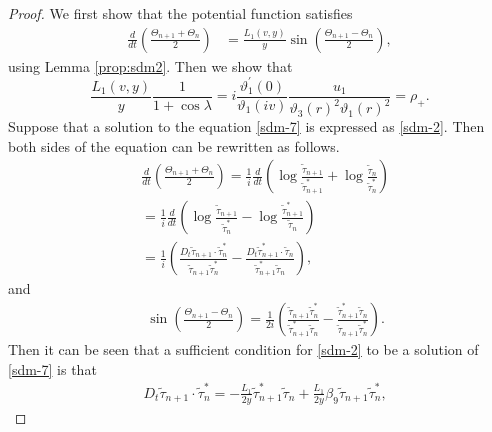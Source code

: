 \documentclass[10pt,leqno]{amsart}
\numberwithin{equation}{section}
\begin{document}
\begin{proof}
We first show that the potential function satisfies
\begin{align}\label{sdm-7}
\frac{d}{dt}\left(\frac{\Theta_{n+1}+\Theta_{n}}{2}\right) & =\frac{L_{1}(v,y)}{y}\sin\left(\frac{\Theta_{n+1}-\Theta_{n}}{2}\right),
\end{align}
using Lemma \ref{prop:sdm2}.
Then we show that
\begin{equation}\label{sdm-r-2}
     \frac{L_{1}(v,y)}{y}\frac{1}{1+\cos\lambda}=i\frac{\vartheta_{1}^{'}(0)}{\vartheta_{1}(iv)}\frac{u_{1}}{\vartheta_{3}(r)^{2}\vartheta_{1}(r)^{2}}=\rho_{+}.
\end{equation}
Suppose that a solution to the equation \eqref{sdm-7} is expressed as \eqref{sdm-2}. 
Then both sides of the equation can be rewritten as follows.
\begin{equation}\label{sdm-5-1}
\begin{split}
&\frac{d}{dt}\left(\frac{\Theta_{n+1}+\Theta_{n}}{2}\right)=\frac{1}{i}\frac{d}{dt}\left(\log\frac{\widetilde{\tau}_{n+1}}{\widetilde{\tau}^{*}_{n+1}}+\log\frac{\widetilde{\tau}_{n}}{\widetilde{\tau}^{*}_{n}}\right)\\
&=\frac{1}{i}\frac{d}{dt}\left(\log\frac{\widetilde{\tau}_{n+1}}{\widetilde{\tau}^{*}_{n}}-\log\frac{\widetilde{\tau}^{*}_{n+1}}{\widetilde{\tau}_{n}}\right)\\
&=\frac{1}{i}\left(\frac{D_{t}\widetilde{\tau}_{n+1}\cdot \widetilde{\tau}^{*}_{n}}{\widetilde{\tau}_{n+1}\widetilde{\tau}^{*}_{n}}-\frac{D_{t}\widetilde{\tau}^{*}_{n+1}\cdot \widetilde{\tau}_{n}}{\widetilde{\tau}^{*}_{n+1}\widetilde{\tau}_{n}}\right),
\end{split}
\end{equation}
and
\begin{equation}\label{sdm-5-2}
\begin{split}
&\sin\left(\frac{\Theta_{n+1}-\Theta_{n}}{2}\right)=\frac{1}{2i}\left(\frac{\widetilde{\tau}_{n+1}\widetilde{\tau}^{*}_{n}}{\widetilde{\tau}^{*}_{n+1}\widetilde{\tau}_{n}}-\frac{\widetilde{\tau}^{*}_{n+1}\widetilde{\tau}_{n}}{\widetilde{\tau}_{n+1}\widetilde{\tau}^{*}_{n}}\right).
\end{split}
\end{equation}
Then it can be seen that a sufficient condition for \eqref{sdm-2} to be a solution of \eqref{sdm-7} is that
\begin{equation}\label{sdm-5-3}
\begin{split}
&D_{t}\widetilde{\tau}_{n+1}\cdot \widetilde{\tau}^{*}_{n}=-\frac{L_{1}}{2y}\widetilde{\tau}^{*}_{n+1}\widetilde{\tau}_{n}+\frac{L_{1}}{2y}\beta_{9}\widetilde{\tau}_{n+1}\widetilde{\tau}_{n}^{*},

\end{split}
\end{equation}
\end{proof}
\end{document}
